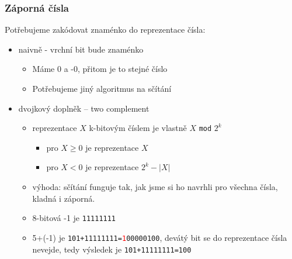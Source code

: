 \begin{frame}
\frametitle{Záporná čísla}

Potřebujeme zakódovat znaménko do reprezentace čísla:
\begin{itemize}
\item naivně - vrchní bit bude znaménko
\begin{itemize}
\item Máme 0 a -0, přitom je to stejné číslo
\item Potřebujeme jiný algoritmus na sčítání  
\end{itemize}
\item dvojkový doplněk -- two complement
\begin{itemize}
\item reprezentace $X$ k-bitovým číslem je vlastně $X$ \texttt{mod} $2^k$
\begin{itemize}
\item pro $X\ge0$ je reprezentace $X$
\item pro $X<0$ je reprezentace $2^k-|X|$
\end{itemize}
\item výhoda: sčítání funguje tak, jak jsme si ho navrhli pro všechna čísla, kladná i záporná.
\end{itemize}
\begin{itemize}
\item 8-bitová -1 je \texttt{11111111}
\item 5+(-1) je \texttt{101+11111111=\textcolor{red}{1}00000100}, devátý bit se do reprezentace čísla nevejde, tedy výsledek je \texttt{101+11111111=100}
\end{itemize}
\end{itemize}


\end{frame}

